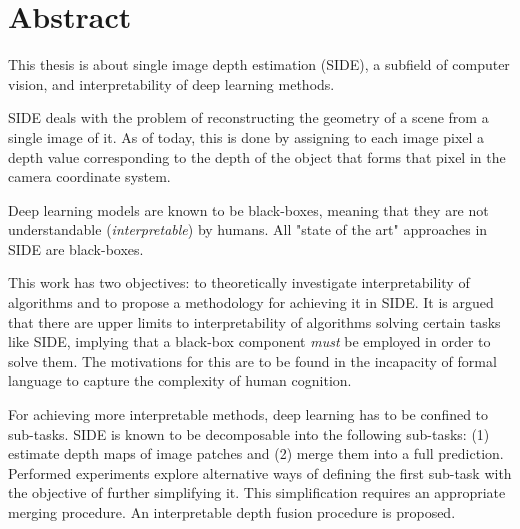 \chapter*{Abstract}

This thesis is about single image depth estimation (SIDE), a subfield of computer vision, and interpretability of deep learning methods.

SIDE deals with the problem of reconstructing the geometry of a scene from a single image of it.
As of today, this is done by assigning to each image pixel a depth value corresponding to the depth of the object that forms that pixel in the camera coordinate system.

Deep learning models are known to be black-boxes, meaning that they are not understandable (\textit{interpretable}) by humans.
All "state of the art" approaches in SIDE are black-boxes.

This work has two objectives: to theoretically investigate interpretability of algorithms and to propose a methodology for achieving it in SIDE.
It is argued that there are upper limits to interpretability of algorithms solving certain tasks like SIDE, implying that a black-box component \textit{must} be employed in order to solve them.
The motivations for this are to be found in the incapacity of formal language to capture the complexity of human cognition.

For achieving more interpretable methods, deep learning has to be confined to sub-tasks.
SIDE is known to be decomposable into the following sub-tasks: (1) estimate depth maps of image patches and (2) merge them into a full prediction.
Performed experiments explore alternative ways of defining the first sub-task with the objective of further simplifying it.
This simplification requires an appropriate merging procedure.
An interpretable depth fusion procedure is proposed.

\thispagestyle{empty}
\mbox{}
\newpage
